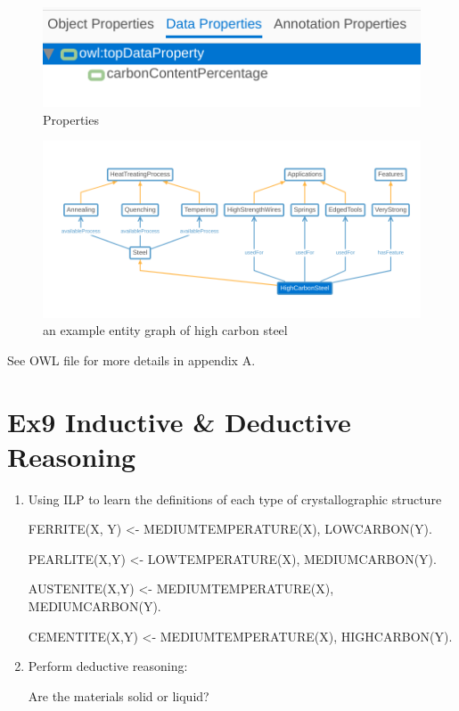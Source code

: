 \documentclass[12pt]{article}
\begin{document}
{\begin{figure}[ht]
{		\begin{minipage}{7cm}
			\centering
			\includegraphics[scale=0.25]{figs/ex8-data-property.png}
		\end{minipage}
	}
	\caption{Properties}
	\label{fig:label10}
\end{figure}
\begin{figure}[ht]
	\centering
	\includegraphics[scale=0.3]{figs/ex8-highcarbonsteel-example.png}
	\caption{an example entity graph of high carbon steel}
	\label{fig:label11}
\end{figure}

See OWL file for more details in appendix A.

\section{Ex9 Inductive \& Deductive Reasoning}
\label{sec: ex9}
\begin{enumerate}[1.]
	\item Using ILP to learn the definitions of each type of crystallographic structure
	
	FERRITE(X, Y) <- MEDIUMTEMPERATURE(X), LOWCARBON(Y).
	
	PEARLITE(X,Y) <- LOWTEMPERATURE(X), MEDIUMCARBON(Y).
	
	AUSTENITE(X,Y) <- MEDIUMTEMPERATURE(X), MEDIUMCARBON(Y).
	
	CEMENTITE(X,Y) <- MEDIUMTEMPERATURE(X), HIGHCARBON(Y).
	\item Perform deductive reasoning:
	
	Are the materials solid or liquid?
	

\end{enumerate}}
\end{document}
